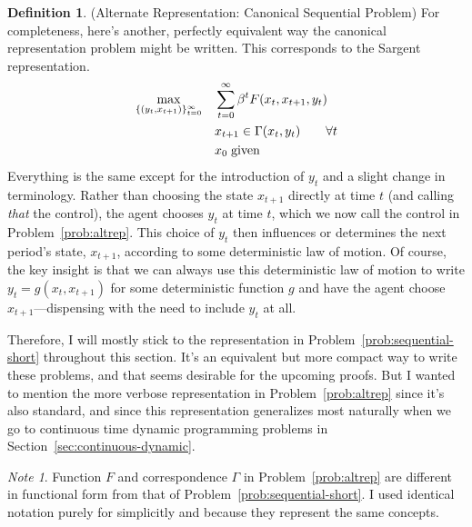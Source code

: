 \documentclass[12pt]{article}
\numberwithin{equation}{section} %
\theoremstyle{plain}
\theoremstyle{definition}
\newtheorem{defn}[thm]{Definition}
\theoremstyle{remark}
\newtheorem*{note}{Note}
\newcommand{\sumtinfz}{\sum^\infty_{t=0}}
\begin{document}
\begin{defn}{(Alternate Representation: Canonical Sequential Problem)}
\label{defn:sequential-altrep}
For completeness, here's another, perfectly equivalent way the canonical
representation problem might be written. This corresponds to the Sargent
representation.
\begin{align}
  \label{prob:altrep}
  \max_{\{(y_t,x_{t+1})\}_{t=0}^\infty}
  \quad &\sumtinfz \beta^t F(x_t,x_{t+1},y_t)\\
  &x_{t+1} \in \Gamma(x_t,y_t) \qquad \forall t\notag\\
  &x_0 \; \text{given}\notag
\end{align}
Everything is the same except for the introduction of $y_t$ and a slight
change in terminology. Rather than choosing the state $x_{t+1}$ directly
at time $t$ (and calling \emph{that} the control), the agent chooses
$y_t$ at time $t$, which we now call the control in
Problem~\ref{prob:altrep}.  This choice of $y_t$ then influences or
determines the next period's state, $x_{t+1}$, according to some
deterministic law of motion. Of course, the key insight is that we can
always use this deterministic law of motion to write $y_t =
g(x_t,x_{t+1})$ for some deterministic function $g$ and have the agent
choose $x_{t+1}$---dispensing with the need to include $y_t$ at all.

Therefore, I will mostly stick to the representation in
Problem~\ref{prob:sequential-short} throughout this section. It's an
equivalent but more compact way to write these problems, and that seems
desirable for the upcoming proofs.
But I wanted to mention the more verbose representation in
Problem~\ref{prob:altrep} since it's also standard, and since this
representation generalizes most naturally when we go to continuous time
dynamic programming problems in Section~\ref{sec:continuous-dynamic}.
\end{defn}
\begin{note}
Function $F$ and correspondence $\Gamma$ in Problem~\ref{prob:altrep}
are different in functional form from that of
Problem~\ref{prob:sequential-short}.  I used identical notation purely
for simplicitly and because they represent the same concepts.
\end{note}

\end{document}
